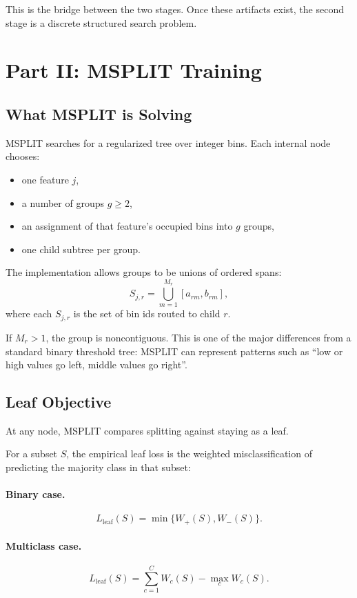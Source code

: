 \documentclass[11pt]{article}
\begin{document}
This is the bridge between the two stages. Once these artifacts exist, the second stage is a discrete structured search problem.

\section{Part II: MSPLIT Training}

\subsection{What MSPLIT is Solving}

MSPLIT searches for a regularized tree over integer bins. Each internal node chooses:

\begin{itemize}
\item one feature \(j\),
\item a number of groups \(g \ge 2\),
\item an assignment of that feature's occupied bins into \(g\) groups,
\item one child subtree per group.
\end{itemize}

The implementation allows groups to be unions of ordered spans:
\[
S_{j,r} = \bigcup_{m=1}^{M_r} [a_{rm}, b_{rm}],
\]
where each \(S_{j,r}\) is the set of bin ids routed to child \(r\).

If \(M_r > 1\), the group is noncontiguous. This is one of the major differences from a standard binary threshold tree: MSPLIT can represent patterns such as ``low or high values go left, middle values go right''.

\subsection{Leaf Objective}

At any node, MSPLIT compares splitting against staying as a leaf.

For a subset \(S\), the empirical leaf loss is the weighted misclassification of predicting the majority class in that subset:

\paragraph{Binary case.}
\[
L_{\mathrm{leaf}}(S) = \min\{W_+(S), W_-(S)\}.
\]

\paragraph{Multiclass case.}
\[
L_{\mathrm{leaf}}(S) = \sum_{c=1}^C W_c(S) - \max_{c} W_c(S).
\]
\end{document}
